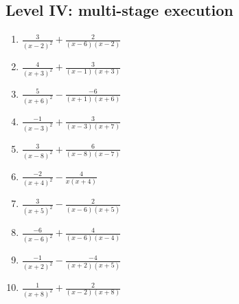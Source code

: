 \documentclass[11pt,oneside]{book}
\begin{document}
\subsection*{Level IV: multi-stage execution}
\begin{enumerate}[leftmargin=*,label=\textbf{\arabic*.},itemsep=0.65\baselineskip]
\item $\displaystyle \frac{3}{\left(x - 2\right)^{2}}+\frac{2}{\left(x - 6\right) \left(x - 2\right)}$
\item $\displaystyle \frac{4}{\left(x + 3\right)^{2}}+\frac{3}{\left(x - 1\right) \left(x + 3\right)}$
\item $\displaystyle \frac{5}{\left(x + 6\right)^{2}}-\frac{-6}{\left(x + 1\right) \left(x + 6\right)}$
\item $\displaystyle \frac{-1}{\left(x - 3\right)^{2}}+\frac{3}{\left(x - 3\right) \left(x + 7\right)}$
\item $\displaystyle \frac{3}{\left(x - 8\right)^{2}}+\frac{6}{\left(x - 8\right) \left(x - 7\right)}$
\item $\displaystyle \frac{-2}{\left(x + 4\right)^{2}}-\frac{4}{x \left(x + 4\right)}$
\item $\displaystyle \frac{3}{\left(x + 5\right)^{2}}-\frac{2}{\left(x - 6\right) \left(x + 5\right)}$
\item $\displaystyle \frac{-6}{\left(x - 6\right)^{2}}+\frac{4}{\left(x - 6\right) \left(x - 4\right)}$
\item $\displaystyle \frac{-1}{\left(x + 2\right)^{2}}-\frac{-4}{\left(x + 2\right) \left(x + 5\right)}$
\item $\displaystyle \frac{1}{\left(x + 8\right)^{2}}+\frac{2}{\left(x - 2\right) \left(x + 8\right)}$
\end{enumerate}
\end{document}
